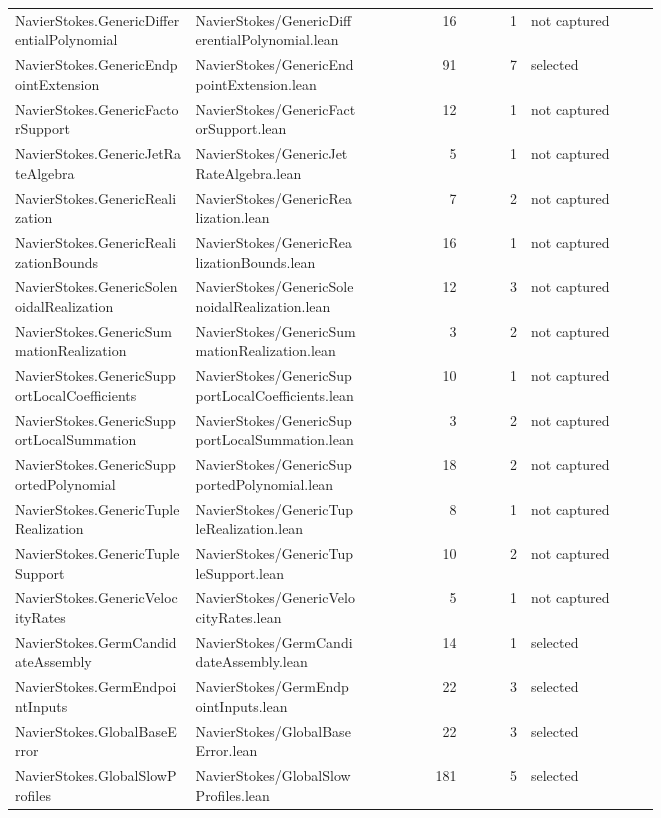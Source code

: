 \documentclass[10pt]{article}
\begin{document}
\begin{longtable}{p{0.28\linewidth}p{0.27\linewidth}r r p{0.20\linewidth}}
NavierStokes.GenericDifferentialPolynomial & NavierStokes/GenericDifferentialPolynomial.lean & 16 & 1 & not captured\\
NavierStokes.GenericEndpointExtension & NavierStokes/GenericEndpointExtension.lean & 91 & 7 & selected\\
NavierStokes.GenericFactorSupport & NavierStokes/GenericFactorSupport.lean & 12 & 1 & not captured\\
NavierStokes.GenericJetRateAlgebra & NavierStokes/GenericJetRateAlgebra.lean & 5 & 1 & not captured\\
NavierStokes.GenericRealization & NavierStokes/GenericRealization.lean & 7 & 2 & not captured\\
NavierStokes.GenericRealizationBounds & NavierStokes/GenericRealizationBounds.lean & 16 & 1 & not captured\\
NavierStokes.GenericSolenoidalRealization & NavierStokes/GenericSolenoidalRealization.lean & 12 & 3 & not captured\\
NavierStokes.GenericSummationRealization & NavierStokes/GenericSummationRealization.lean & 3 & 2 & not captured\\
NavierStokes.GenericSupportLocalCoefficients & NavierStokes/GenericSupportLocalCoefficients.lean & 10 & 1 & not captured\\
NavierStokes.GenericSupportLocalSummation & NavierStokes/GenericSupportLocalSummation.lean & 3 & 2 & not captured\\
NavierStokes.GenericSupportedPolynomial & NavierStokes/GenericSupportedPolynomial.lean & 18 & 2 & not captured\\
NavierStokes.GenericTupleRealization & NavierStokes/GenericTupleRealization.lean & 8 & 1 & not captured\\
NavierStokes.GenericTupleSupport & NavierStokes/GenericTupleSupport.lean & 10 & 2 & not captured\\
NavierStokes.GenericVelocityRates & NavierStokes/GenericVelocityRates.lean & 5 & 1 & not captured\\
NavierStokes.GermCandidateAssembly & NavierStokes/GermCandidateAssembly.lean & 14 & 1 & selected\\
NavierStokes.GermEndpointInputs & NavierStokes/GermEndpointInputs.lean & 22 & 3 & selected\\
NavierStokes.GlobalBaseError & NavierStokes/GlobalBaseError.lean & 22 & 3 & selected\\
NavierStokes.GlobalSlowProfiles & NavierStokes/GlobalSlowProfiles.lean & 181 & 5 & selected\\

\end{longtable}
\end{document}
